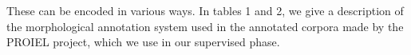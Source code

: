 These can be encoded in various ways. In tables 1 and 2, we give a
description of the morphological annotation system used in the
annotated corpora made by the PROIEL project, which we use in our
supervised phase.

